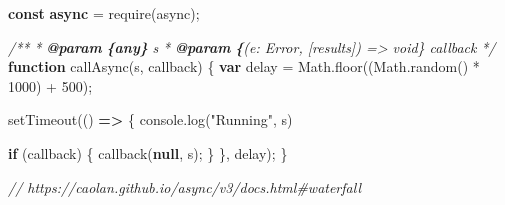 \documentclass[11pt]{article}
\newenvironment{Shaded}{}{}
\newcommand{\KeywordTok}[1]{\textcolor[rgb]{0.00,0.44,0.13}{\textbf{{#1}}}}
\newcommand{\DecValTok}[1]{\textcolor[rgb]{0.25,0.63,0.44}{{#1}}}
\newcommand{\StringTok}[1]{\textcolor[rgb]{0.25,0.44,0.63}{{#1}}}
\newcommand{\CommentTok}[1]{\textcolor[rgb]{0.38,0.63,0.69}{\textit{{#1}}}}
\newcommand{\FunctionTok}[1]{\textcolor[rgb]{0.02,0.16,0.49}{{#1}}}
\newcommand{\NormalTok}[1]{{#1}}
\newcommand{\AnnotationTok}[1]{\textcolor[rgb]{0.38,0.63,0.69}{\textbf{\textit{{#1}}}}}
\newcommand{\CommentVarTok}[1]{\textcolor[rgb]{0.38,0.63,0.69}{\textbf{\textit{{#1}}}}}
\newcommand{\ControlFlowTok}[1]{\textcolor[rgb]{0.00,0.44,0.13}{\textbf{{#1}}}}
\newcommand{\OperatorTok}[1]{\textcolor[rgb]{0.40,0.40,0.40}{{#1}}}
\newcommand{\BuiltInTok}[1]{{#1}}
\newcommand{\PreprocessorTok}[1]{\textcolor[rgb]{0.74,0.48,0.00}{{#1}}}
\begin{document}
\begin{Shaded}
\begin{Highlighting}[]
\KeywordTok{const} \KeywordTok{async} \OperatorTok{=} \PreprocessorTok{require}\NormalTok{(}\StringTok{\textquotesingle{}async\textquotesingle{}}\NormalTok{)}\OperatorTok{;}

\CommentTok{/**}
\CommentTok{ * }\AnnotationTok{@param}\CommentTok{ }\CommentVarTok{\{any\}}\CommentTok{ s }
\CommentTok{ * }\AnnotationTok{@param}\CommentTok{ }\CommentVarTok{\{}\CommentTok{(e: Error, [results]) =\textgreater{} void\} callback }
\CommentTok{ */}
\KeywordTok{function} \FunctionTok{callAsync}\NormalTok{(s}\OperatorTok{,}\NormalTok{ callback) \{}
    \KeywordTok{var}\NormalTok{ delay }\OperatorTok{=} \BuiltInTok{Math}\OperatorTok{.}\FunctionTok{floor}\NormalTok{((}\BuiltInTok{Math}\OperatorTok{.}\FunctionTok{random}\NormalTok{() }\OperatorTok{*} \DecValTok{1000}\NormalTok{) }\OperatorTok{+} \DecValTok{500}\NormalTok{)}\OperatorTok{;}

    \PreprocessorTok{setTimeout}\NormalTok{(() }\KeywordTok{=\textgreater{}}\NormalTok{ \{}
        \BuiltInTok{console}\OperatorTok{.}\FunctionTok{log}\NormalTok{(}\StringTok{"Running"}\OperatorTok{,}\NormalTok{ s)}

        \ControlFlowTok{if}\NormalTok{ (callback) \{}
            \FunctionTok{callback}\NormalTok{(}\KeywordTok{null}\OperatorTok{,}\NormalTok{ s)}\OperatorTok{;}
\NormalTok{        \}}
\NormalTok{    \}}\OperatorTok{,}\NormalTok{ delay)}\OperatorTok{;}
\NormalTok{\}}

\CommentTok{// https://caolan.github.io/async/v3/docs.html\#waterfall}


\end{Highlighting}
\end{Shaded}
\end{document}

